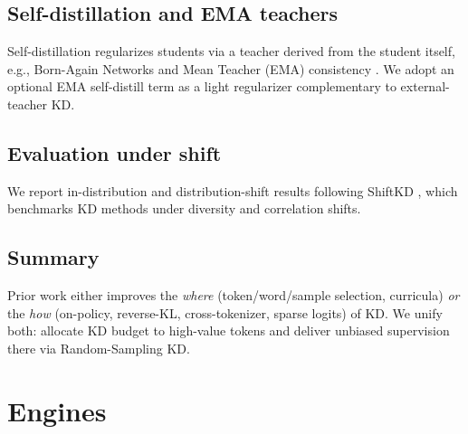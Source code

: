 \documentclass[11pt]{article}
\begin{document}
\subsection{Self-distillation and EMA teachers} Self-distillation regularizes students via a teacher derived from the student itself, e.g., Born-Again Networks \citep{furlanello2018ban} and Mean Teacher (EMA) consistency \citep{tarvainen2017meanteacher}. We adopt an optional EMA self-distill term as a light regularizer complementary to external-teacher KD.

\subsection{Evaluation under shift} We report in-distribution and distribution-shift results following ShiftKD \citep{zhang2023shiftkd}, which benchmarks KD methods under diversity and correlation shifts.

\subsection{Summary} Prior work either improves the \emph{where} (token/word/sample selection, curricula) \emph{or} the \emph{how} (on-policy, reverse-KL, cross-tokenizer, sparse logits) of KD. We unify both: allocate KD budget to high-value tokens and deliver unbiased supervision there via Random-Sampling KD.

\section{Engines}
\end{document}
